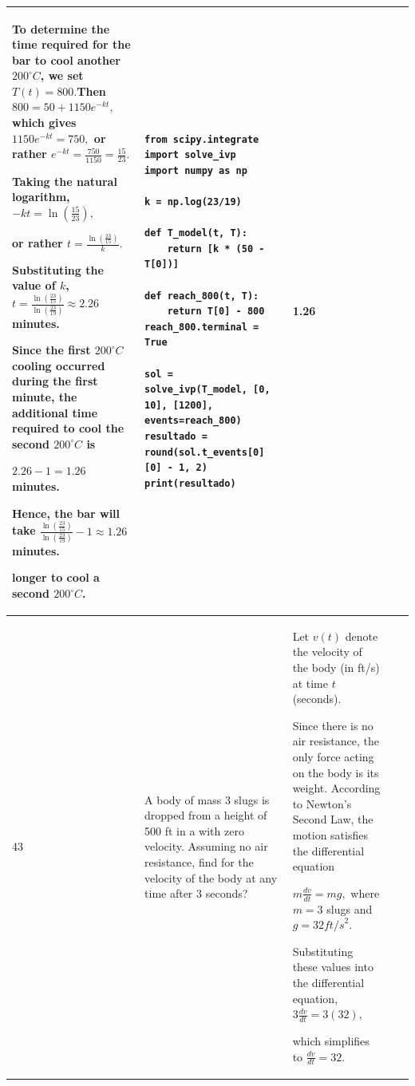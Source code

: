\documentclass[a4paper,12pt]{article}
\begin{document}
\begin{longtable}{|p{0.3cm}|p{}|p{10cm}|p{}|p{1.5cm}|}
To determine the time required for the bar to cool another $200^\circ C$, we set$T(t)=800.$Then$800=50+1150e^{-kt},$ which gives
$1150e^{-kt}=750,$ or rather $e^{-kt}=\frac{750}{1150}=\frac{15}{23}.$

Taking the natural logarithm, $-kt=\ln\left(\frac{15}{23}\right),$

or rather $t=\frac{\ln\left(\frac{23}{15}\right)}{k}.$

Substituting the value of $k$, $t=
\frac{\ln\left(\frac{23}{15}\right)}
{\ln\left(\frac{23}{19}\right)}
\approx2.26$  minutes.


Since the first $200^\circ C$ cooling occurred during the first minute, the additional time required to cool the second $200^\circ C$ is

$2.26-1=1.26$ minutes.

Hence, the bar will take $\frac{\ln\left(\frac{23}{15}\right)}
{\ln\left(\frac{23}{19}\right)}-1\approx1.26$ minutes.

longer to cool a second $200^\circ C$. &\begin{verbatim}
from scipy.integrate import solve_ivp
import numpy as np

k = np.log(23/19)

def T_model(t, T):
    return [k * (50 - T[0])]

def reach_800(t, T):
    return T[0] - 800
reach_800.terminal = True

sol = solve_ivp(T_model, [0, 10], [1200], events=reach_800)
resultado = round(sol.t_events[0][0] - 1, 2)
print(resultado)
\end{verbatim}& 1.26   \\ \hline   

43            & A body of mass 3 slugs is dropped from a height of 500 ft in a with zero velocity. Assuming no air resistance, find for the velocity of the body at any time after 3 seconds?


              &Let $v(t)$ denote the velocity of the body (in ft/s) at time $t$ (seconds).

Since there is no air resistance, the only force acting on the body is its weight. According to Newton's Second Law, the motion satisfies the differential equation

$m\frac{dv}{dt}=mg,$ where $m=3$ slugs and $g=32{ ft/s}^2$.

Substituting these values into the differential equation, $3\frac{dv}{dt}=3(32),$

which simplifies to $\frac{dv}{dt}=32.$


\end{longtable}
\end{document}

